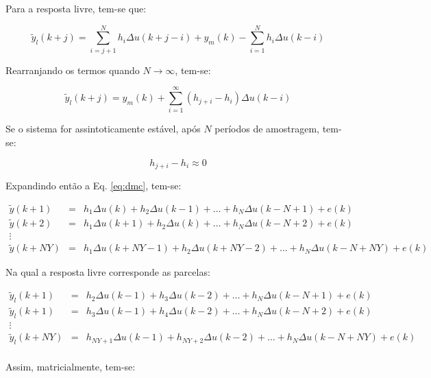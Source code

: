 Para a resposta livre, tem-se que:

\begin{equation*}
\tilde{y}_l(k+j) = \sum_{i=j+1}^N h_i\Delta u(k+j-i) + y_m(k) - 
                   \sum_{i=1}^N h_i\Delta u(k-i)
\end{equation*}

Rearranjando os termos quando $N \rightarrow \infty$, tem-se:

\begin{equation}\label{eq:resp_livre}
\tilde{y}_l(k+j) = y_m(k) + \sum_{i=1}^\infty (h_{j+i}-h_i)\Delta u(k-i)
\end{equation}

Se o sistema for assintoticamente estável, após $N$ períodos de amostragem,
tem-se:

\begin{equation*}
h_{j+i} - h_i \approx 0
\end{equation*}

Expandindo então a Eq. \ref{eq:dmc}, tem-se:

\begin{eqnarray}
\tilde{y}(k+1)  & = & h_1\Delta u(k) + h_2\Delta u(k-1) + \ldots + h_N\Delta
                      u(k-N+1) + e(k)\nonumber\\
\tilde{y}(k+2)  & = & h_1\Delta u(k+1) + h_2\Delta u(k) + \ldots + h_N\Delta
                      u(k-N+2) + e(k)\nonumber\\
\vdots\nonumber\\
\tilde{y}(k+NY) & = & h_1\Delta u(k+NY-1) + h_2\Delta u(k+NY-2) + \ldots + 
                      h_N\Delta u(k-N+NY) + e(k)\nonumber
\end{eqnarray}

Na qual a resposta livre corresponde as parcelas:

\begin{eqnarray}
\tilde{y}_l(k+1)  & = & h_2\Delta u(k-1) + h_3\Delta u(k-2) + \ldots +
                        h_N\Delta u(k-N+1) + e(k)\nonumber\\
\tilde{y}_l(k+1)  & = & h_3\Delta u(k-1) + h_4\Delta u(k-2) + \ldots +
                        h_N\Delta u(k-N+2) + e(k)\nonumber\\
\vdots\nonumber\\
\tilde{y}_l(k+NY) & = & h_{NY+1}\Delta u(k-1) + h_{NY+2}\Delta u(k-2) + 
                        \ldots + h_N\Delta u(k-N+NY) + e(k)\nonumber\\
\end{eqnarray}

Assim, matricialmente, tem-se:

